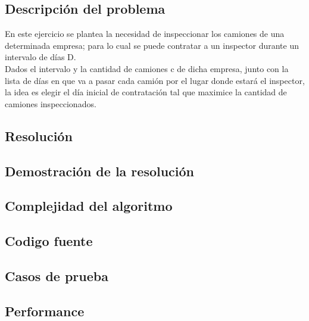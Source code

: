 \subsection{Descripci\'on del problema}

En este ejercicio se plantea la necesidad de inspeccionar los camiones de una determinada empresa; para lo cual se puede contratar a un inspector durante un intervalo de d\'ias D. \\ 
Dados el intervalo y la cantidad de camiones c de dicha empresa, junto con la lista de d\'ias en que va a pasar cada cami\'on por el lugar donde estar\'a el inspector, la idea es elegir el d\'ia inicial de contrataci\'on tal que maximice la cantidad de camiones inspeccionados. \\

\subsection{Resoluci\'on}



\subsection{Demostraci\'on de la resoluci\'on}

\subsection{Complejidad del algoritmo}

\subsection{Codigo fuente}

\subsection{Casos de prueba}

\subsection{Performance}
